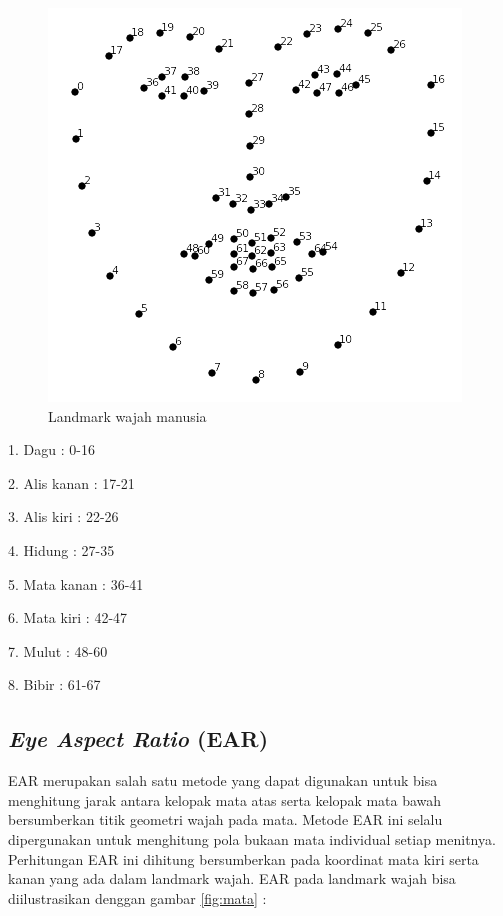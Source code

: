 \begin{figure} [H] \centering
  \includegraphics[scale=0.75]{gambar/wajah.png}
  \caption{Landmark wajah manusia \parencite{16}}
  \label{fig:wajah}
\end{figure}

1.	Dagu		: 0-16

2.	Alis kanan	: 17-21

3.	Alis kiri		: 22-26

4.	Hidung		: 27-35

5.	Mata kanan	: 36-41

6.	Mata kiri	: 42-47

7.	Mulut		: 48-60

8.	Bibir		: 61-67

\subsection{\emph{Eye Aspect Ratio} (EAR)}
EAR merupakan salah satu metode yang dapat digunakan untuk bisa menghitung jarak antara kelopak mata atas serta
kelopak mata bawah bersumberkan titik geometri wajah pada mata. Metode EAR ini selalu dipergunakan untuk menghitung
pola bukaan mata individual setiap menitnya. Perhitungan EAR ini dihitung bersumberkan pada koordinat mata kiri serta
kanan yang ada dalam landmark wajah. EAR pada landmark wajah bisa diilustrasikan denggan gambar \ref{fig:mata} :

